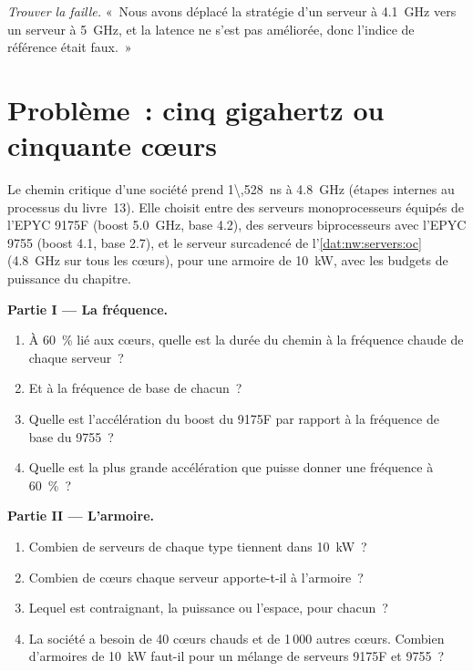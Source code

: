 \begin{exercise}[$\star\star\star$]\label{exo:nw:servers:8}
\emph{Trouver la faille.} «~Nous avons déplacé la stratégie d'un serveur à 4.1~GHz vers un serveur à 5~GHz, et la latence ne s'est pas améliorée, donc l'indice de référence était faux.~»
\end{exercise}

\section{Problème~: cinq gigahertz ou cinquante cœurs}

\begin{problem}\label{pb:nw:servers:1}
Le chemin critique d'une société prend \qty{1\,528}{\nano\second} à 4.8~GHz (étapes internes au processus du livre~13). Elle choisit entre des serveurs monoprocesseurs
équipés de l'EPYC 9175F (boost 5.0~GHz, base 4.2), des serveurs biprocesseurs avec l'EPYC 9755 (boost 4.1, base 2.7), et le serveur
surcadencé de l'\cref{dat:nw:servers:oc} (4.8~GHz sur tous les cœurs), pour une armoire de \qty{10}{\kilo\watt}, avec les budgets de puissance du chapitre.

\medskip\noindent\textbf{Partie I --- La fréquence.}
\begin{enumerate}
\item À 60~\% lié aux cœurs, quelle est la durée du chemin à la fréquence chaude de chaque serveur~?
\item Et à la fréquence de base de chacun~?
\item Quelle est l'accélération du boost du 9175F par rapport à la fréquence de base du 9755~?
\item Quelle est la plus grande accélération que puisse donner une fréquence à 60~\%~?
\end{enumerate}

\medskip\noindent\textbf{Partie II --- L'armoire.}
\begin{enumerate}[resume]
\item Combien de serveurs de chaque type tiennent dans \qty{10}{\kilo\watt}~?
\item Combien de cœurs chaque serveur apporte-t-il à l'armoire~?
\item Lequel est contraignant, la puissance ou l'espace, pour chacun~?
\item La société a besoin de 40 cœurs chauds et de 1\,000 autres cœurs. Combien d'armoires de \qty{10}{\kilo\watt} faut-il pour un mélange de serveurs 9175F et 9755~?
\end{enumerate}


\end{problem}
